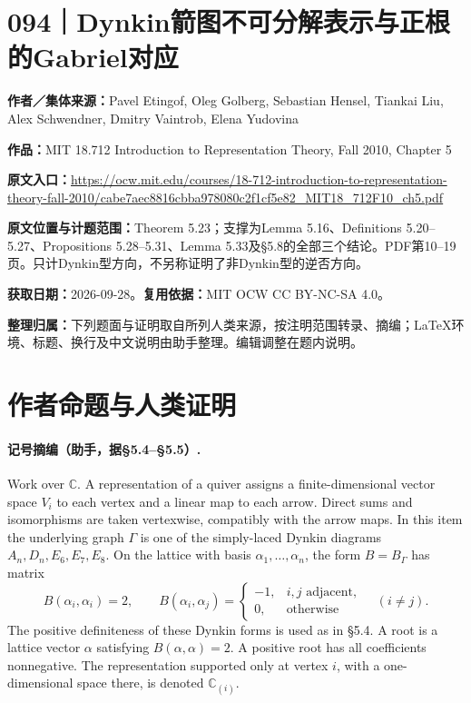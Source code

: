 \documentclass[UTF8,11pt,a4paper]{ctexart}
\theoremstyle{definition}\newtheorem*{definition}{Definition}
\theoremstyle{remark}\newtheorem*{remark}{Remark}
\newcommand{\C}{\mathbb C}
\begin{document}
\section*{094｜Dynkin箭图不可分解表示与正根的Gabriel对应}
\textbf{作者／集体来源：}Pavel Etingof, Oleg Golberg, Sebastian Hensel, Tiankai Liu, Alex Schwendner, Dmitry Vaintrob, Elena Yudovina

\textbf{作品：}MIT 18.712 Introduction to Representation Theory, Fall 2010, Chapter 5

\textbf{原文入口：}\url{https://ocw.mit.edu/courses/18-712-introduction-to-representation-theory-fall-2010/cabe7aec8816cbba978080c2f1cf5e82_MIT18_712F10_ch5.pdf}

\textbf{原文位置与计题范围：}Theorem 5.23；支撑为Lemma 5.16、Definitions 5.20--5.27、Propositions 5.28--5.31、Lemma 5.33及§5.8的全部三个结论。PDF第10--19页。只计Dynkin型方向，不另称证明了非Dynkin型的逆否方向。

\textbf{获取日期：}2026-09-28。\quad\textbf{复用依据：}MIT OCW CC BY-NC-SA 4.0。

\textbf{整理归属：}下列题面与证明取自所列人类来源，按注明范围转录、摘编；LaTeX环境、标题、换行及中文说明由助手整理。编辑调整在题内说明。

\section*{作者命题与人类证明}

\paragraph{记号摘编（助手，据§5.4--§5.5）.}
Work over $\C$. A representation of a quiver assigns a finite-dimensional vector space $V_i$ to each vertex and a linear map to each arrow. Direct sums and isomorphisms are taken vertexwise, compatibly with the arrow maps. In this item the underlying graph $\Gamma$ is one of the simply-laced Dynkin diagrams $A_n,D_n,E_6,E_7,E_8$. On the lattice with basis $\alpha_1,\ldots,\alpha_n$, the form $B=B_\Gamma$ has matrix
\[
B(\alpha_i,\alpha_i)=2,\qquad
B(\alpha_i,\alpha_j)=
\begin{cases}-1,&i,j\text{ adjacent},\\0,&\text{otherwise}\end{cases}\quad(i\ne j).
\]
The positive definiteness of these Dynkin forms is used as in §5.4. A root is a lattice vector $\alpha$ satisfying $B(\alpha,\alpha)=2$. A positive root has all coefficients nonnegative. The representation supported only at vertex $i$, with a one-dimensional space there, is denoted $\C_{(i)}$.
\end{document}
